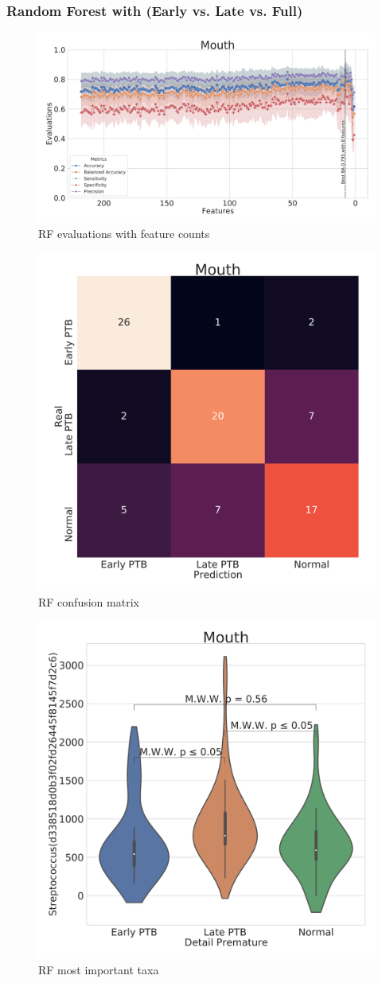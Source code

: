\documentclass{beamer}
\begin{document}
    \begin{frame}[allowframebreaks]
        \frametitle{Random Forest with (Early vs. Late vs. Full)}

        \begin{figure}
            \includegraphics[width=0.8 \linewidth]{figures/RandomForest/RF.DADA2.homd/Mouth+metrics.pdf}
            \caption{RF evaluations with feature counts}
        \end{figure}

        \begin{figure}
            \includegraphics[width=0.5 \linewidth]{figures/RandomForest/RF.DADA2.homd/Mouth+heatmap.pdf}
            \caption{RF confusion matrix}
        \end{figure}

        \begin{figure}
            \includegraphics[width=0.5 \linewidth]{figures/RandomForest/RF.DADA2.homd/Mouth+Violin_0.pdf}
            \caption{RF most important taxa}
        \end{figure}
    \end{frame}
\end{document}
